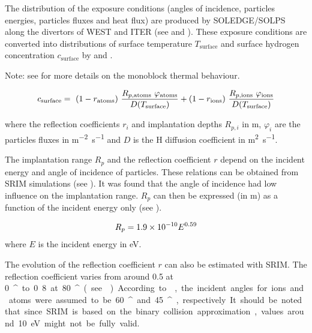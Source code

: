 The distribution of the exposure conditions (angles of incidence, particles energies, particles fluxes and heat flux) are produced by SOLEDGE/SOLPS along the divertors of WEST and ITER (see  and ).
These exposure conditions are converted into distributions of surface temperature $T_\mathrm{surface}$ and surface hydrogen concentration $c_\mathrm{surface}$ by  and .

Note: see  for more details on the monoblock thermal behaviour.

\begin{equation}
    c_\mathrm{surface} = \ (1 - r_\mathrm{atoms}) \ \frac{R_{p, \mathrm{atoms}} \ \varphi_\mathrm{atoms}}{D(T_\mathrm{surface})} + (1 - r_\mathrm{ions})  \ \frac{R_{p, \mathrm{ions}} \ \varphi_\mathrm{ions}}{D(T_\mathrm{surface})}
    \labeq{c_surface}
\end{equation}

where the reflection coefficients $r_i$ and implantation depths $R_{p, i}$ in \si{m}, $\varphi_{i}$ are the particles fluxes in \si{m^{-2}.s^{-1}} and $D$ is the H diffusion coefficient in \si{m^{2}.s^{-1}}.

The implantation range $R_p$ and the reflection coefficient $r$ depend on the incident energy and angle of incidence of particles.
These relations can be obtained from SRIM  simulations (see ).
It was found that the angle of incidence had low influence on the implantation range.
$R_p$ can then be expressed (in \si{m}) as a function of the incident energy only (see ).

\begin{equation}
    R_p = 1.9\times 10^{-10} E ^{0.59}
    \labeq{implantation range}
\end{equation}
where $E$ is the incident energy in \si{eV}.

The evolution of the reflection coefficient $r$ can also be estimated with SRIM.
The reflection coefficient varies from around 0.5 at \SI{0}{^\circ} to 0.8 at \SI{80}{^\circ} (see ).
According to , the incident angles for ions and atoms were assumed to be \SI{60}{^\circ} and \SI{45}{^\circ}, respectively.
It should be noted that since SRIM is based on the binary collision approximation, values around \SI{10}{eV} might not be fully valid.

